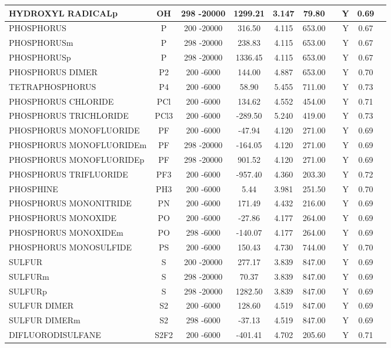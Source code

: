 \begin{longtable}{@{\extracolsep{\fill}}|l|c|c|c|c|c|c|c|c|l|}
HYDROXYL RADICALp&OH&298 -20000& 1299.21& 3.147&    79.80& &Y& 0.69&\\ \hline
PHOSPHORUS&P&200 -20000&  316.50& 4.115&   653.00& &Y& 0.67&\\ \hline
PHOSPHORUSm&P&298 -20000&  238.83& 4.115&   653.00& &Y& 0.67&\\ \hline
PHOSPHORUSp&P&298 -20000& 1336.45& 4.115&   653.00& &Y& 0.67&\\ \hline
PHOSPHORUS DIMER&P2&200 -6000&  144.00& 4.887&   653.00& &Y& 0.70&\\ \hline
TETRAPHOSPHORUS&P4&200 -6000&   58.90& 5.455&   711.00& &Y& 0.73&\\ \hline
PHOSPHORUS CHLORIDE&PCl&200 -6000&  134.62& 4.552&   454.00& &Y& 0.71&\\ \hline
PHOSPHORUS TRICHLORIDE&PCl3&200 -6000& -289.50& 5.240&   419.00& &Y& 0.73&\\ \hline
PHOSPHORUS MONOFLUORIDE&PF&200 -6000&  -47.94& 4.120&   271.00& &Y& 0.69&\\ \hline
PHOSPHORUS MONOFLUORIDEm&PF&298 -20000& -164.05& 4.120&   271.00& &Y& 0.69&\\ \hline
PHOSPHORUS MONOFLUORIDEp&PF&298 -20000&  901.52& 4.120&   271.00& &Y& 0.69&\\ \hline
PHOSPHORUS TRIFLUORIDE&PF3&200 -6000& -957.40& 4.360&   203.30& &Y& 0.72&\\ \hline
PHOSPHINE&PH3&200 -6000&    5.44& 3.981&   251.50& &Y& 0.70&\\ \hline
PHOSPHORUS MONONITRIDE&PN&200 -6000&  171.49& 4.432&   216.00& &Y& 0.69&\\ \hline
PHOSPHORUS MONOXIDE&PO&200 -6000&  -27.86& 4.177&   264.00& &Y& 0.69&\\ \hline
PHOSPHORUS MONOXIDEm&PO&298 -6000& -140.07& 4.177&   264.00& &Y& 0.69&\\ \hline
PHOSPHORUS MONOSULFIDE&PS&200 -6000&  150.43& 4.730&   744.00& &Y& 0.70&\\ \hline
SULFUR&S&200 -20000&  277.17& 3.839&   847.00& &Y& 0.69&\\ \hline
SULFURm&S&298 -20000&   70.37& 3.839&   847.00& &Y& 0.69&\\ \hline
SULFURp&S&298 -20000& 1282.50& 3.839&   847.00& &Y& 0.69&\\ \hline
SULFUR DIMER&S2&200 -6000&  128.60& 4.519&   847.00& &Y& 0.69&\\ \hline
SULFUR DIMERm&S2&298 -6000&  -37.13& 4.519&   847.00& &Y& 0.69&\\ \hline
DIFLUORODISULFANE&S2F2&200 -6000& -401.41& 4.702&   205.60& &Y& 0.71&\\ \hline

\end{longtable}

